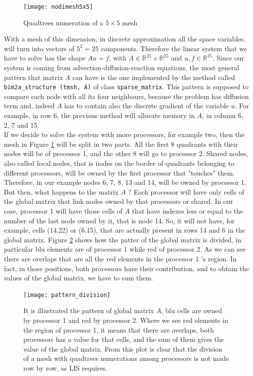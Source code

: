 \begin{figure}[h]
	
	\centering
	\texttt{[image: nodimesh5x5]}
	\caption[Quadtrees numeration of nodes for a mesh $ 5 \times 5 $]{Quadtrees numeration of a $ 5 \times 5 $ mesh}
	\label{nodimesh5x5}
\end{figure}
With a mesh of this dimension, in discrete approximation all the space variables, will turn into  vectors of $ 5^2 = 25 $ components. Therefore the linear system that we have to solve has the shape $ A u = f $, with $ A \in \mathbb{R}^{25} \times \mathbb{R}^{25} $ and  $ u,f \in \mathbb{R}^{25} $. Since our system is coming from advection-diffusion-reaction equations, the most general pattern that matrix $ A $ can have is the one implemented by the method  called \texttt{bim2a\_structure (tmsh, A)} of class \texttt{sparse\_matrix}. This pattern is supposed to compare each node with all its four neighbours, because the problem has diffusion term and, indeed $ A $ has to contain also the discrete gradient of the variable $ u $. For example, in row 6, the previous method will allocate memory in $ A $, in column 6, 2, 7 and 15.\\
If we decide to solve the system with more processors, for example two, then the mesh in Figure \ref{nodimesh5x5} will be split in two parts. All the first 8 quadrants with their nodes will be of processor 1, and the other 8 will go to processor 2. Shared nodes, also called local nodes, that is nodes on the border of quadrants belonging to different processors, will be owned by the first processor that "touches" them. Therefore, in our example nodes 6, 7, 8, 13 and 14, will be owned by processor 1. But then, what happens to the matrix $ A $ ? Each processor will have only cells of the global matrix that link nodes owned by that processors or shared. In our case, processor 1 will have those cells of $ A $ that have indexes less or equal to the number of the last node owned by it, that is node 14. So, it will not have, for example, cells (14,22) or (6,15), that are actually present in rows 14 and 6 in the global matrix.
Figure \ref{patterndivision} shows how the patter of the global matrix is divided, in particular blu elements are of processor 1 while red of processor 2. As we can see there are overlaps that are all the red elements in the processor 1 's region. In fact, in those positions, both processors have their contribution, and to obtain the values of the global matrix, we have to sum them.\\
\begin{figure}[h]
	
	\centering
	\texttt{[image: pattern\_division]}
	\caption[Patter of a matrix come from a mesh $ 5 \times 5 $ ]{It is illustrated the pattern of global matrix $ A $, blu cells are owned by processor 1 and red by processor 2. Where we see red elements in the region of processor 1, it means that there are overlaps, both processors has a value for that cells, and the sum of them gives the value of the global matrix. From this plot is clear that the division of a mesh with quadtrees numerations among processors is not made row by row, as LIS requires. }
	\label{patterndivision}
\end{figure}
